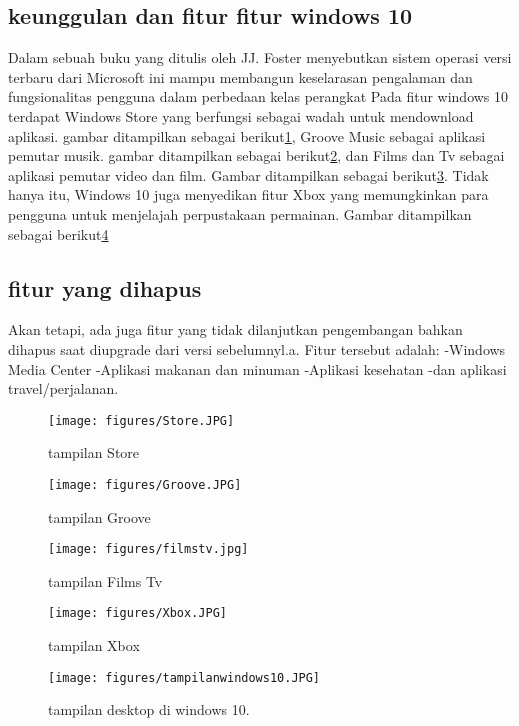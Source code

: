 		\subsection{keunggulan dan fitur fitur windows 10}
			Dalam sebuah buku yang ditulis oleh JJ. Foster menyebutkan sistem operasi versi terbaru dari Microsoft ini mampu membangun keselarasan pengalaman dan fungsionalitas pengguna 
			dalam perbedaan kelas perangkat \cite{foster2001data} 
			Pada fitur windows 10 terdapat Windows Store yang berfungsi sebagai wadah untuk mendownload aplikasi. gambar ditampilkan sebagai berikut\ref{Store}, Groove Music sebagai 
			aplikasi pemutar musik. gambar ditampilkan sebagai berikut\ref{Groove}, dan Films dan Tv sebagai aplikasi pemutar video dan film. Gambar ditampilkan sebagai berikut\ref{filmstv}. 
			Tidak hanya itu, Windows 10 juga menyedikan fitur Xbox yang memungkinkan para pengguna untuk menjelajah perpustakaan permainan. Gambar ditampilkan sebagai berikut\ref{Xbox}
		\subsection{fitur yang dihapus}
			Akan tetapi, ada juga fitur yang tidak dilanjutkan pengembangan bahkan dihapus saat diupgrade dari versi sebelumnyl.a. Fitur tersebut adalah:
			-Windows Media Center
			-Aplikasi makanan dan minuman
			-Aplikasi kesehatan
			-dan aplikasi travel/perjalanan.

\begin{figure}[ht]
\centerline{\texttt{[image: figures/Store.JPG]}}
\caption{tampilan Store}
\label{Store}
\end{figure}

\begin{figure}[ht]
\centerline{\texttt{[image: figures/Groove.JPG]}}
\caption{tampilan Groove}
\label{Groove}
\end{figure}

\begin{figure}[ht]
\centerline{\texttt{[image: figures/filmstv.jpg]}}
\caption{tampilan Films Tv}
\label{filmstv}
\end{figure}

\begin{figure}[ht]
\centerline{\texttt{[image: figures/Xbox.JPG]}}
\caption{tampilan Xbox}
\label{Xbox}
\end{figure}

\begin{figure}[ht]
\centerline{\texttt{[image: figures/tampilanwindows10.JPG]}}
\caption{tampilan desktop di windows 10.}
\label{tampilanwindows10}
\end{figure}
